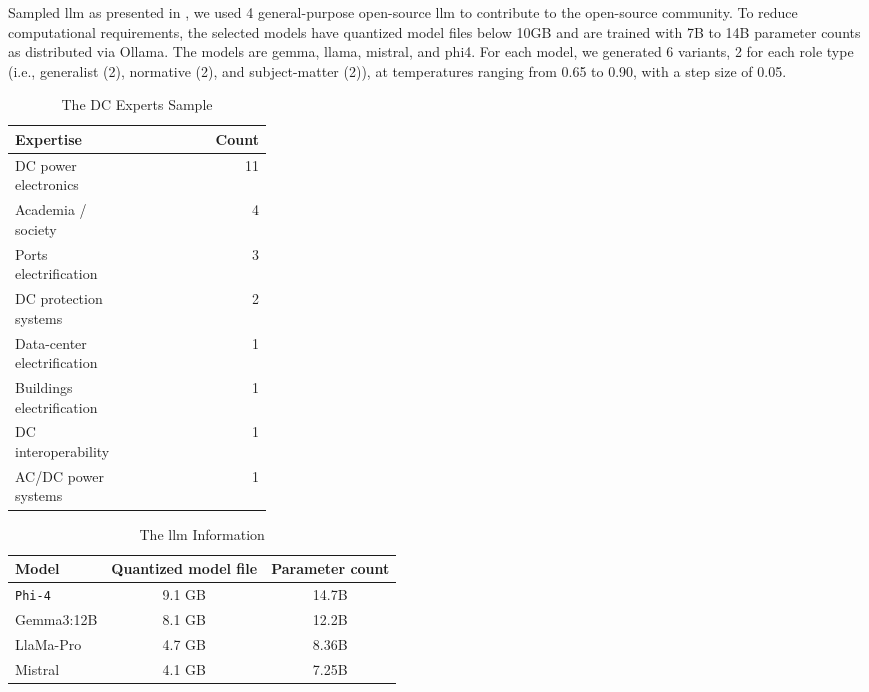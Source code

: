 \documentclass[manuscript,review,anonymous]{acmart}
\begin{document}
Sampled \gls{llm} as presented in , we used 4 general-purpose open-source \gls{llm} to contribute to the open-source community. To reduce computational requirements, the selected models have quantized model files below 10GB and are trained with 7B to 14B parameter counts as distributed via Ollama. The models are \gls{gemma}, \gls{llama}, \gls{mistral}, and \gls{phi4}. For each model, we generated 6 variants, 2 for each role type (i.e., generalist (2), normative (2), and subject-matter (2)), at temperatures ranging from 0.65 to 0.90, with a step size of 0.05. 

\begin{table}[h!]
  \centering
  \caption{The DC Experts Sample}
  \label{tab:DC-experts-sample}
  \small
  \begin{tabular}{p{0.30\linewidth} r}
    \toprule
    Expertise & Count \\
    \midrule
    DC power electronics        & 11 \\
    Academia / society          & 4  \\
    Ports electrification       & 3  \\
    DC protection systems       & 2  \\
    Data-center electrification & 1  \\
    Buildings electrification   & 1  \\
    DC interoperability         & 1  \\
    AC/DC power systems         & 1  \\
    \bottomrule
  \end{tabular}
\end{table}


\begin{table}[h!]
\centering
\caption{The \gls{llm} Information}
\vspace{-1em}
\label{tab:llms-sample}
\small
\begin{tabular}{lcc}
\hline
Model & Quantized model file & Parameter count \\
\hline
\texttt{Phi-4} & 9.1 GB & 14.7B \\
Gemma3:12B & 8.1 GB & 12.2B \\
LlaMa-Pro & 4.7 GB & 8.36B \\
Mistral & 4.1 GB & 7.25B \\
\hline
\end{tabular}
\end{table}
\end{document}
